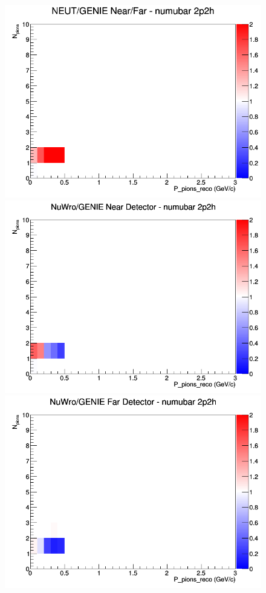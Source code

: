 \documentclass[12pt]{article}
\begin{document}
\begin{figure}[h]
\endminipage
{}
\includegraphics[width=\linewidth]{eff_N_P/LAr/pions/ratios/2p2h_NEUT_GENIE_numubar_NF_N_P.png}
\endminipage
\newline
{}
\includegraphics[width=\linewidth]{eff_N_P/LAr/pions/ratios/2p2h_NuWro_GENIE_numubar_near_N_P.png}
\endminipage
{}
\includegraphics[width=\linewidth]{eff_N_P/LAr/pions/ratios/2p2h_NuWro_GENIE_numubar_far_N_P.png}

\end{figure}
\end{document}
